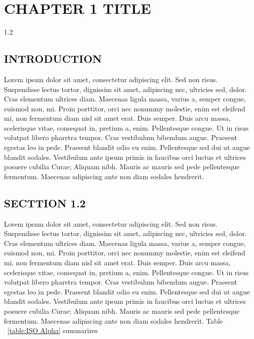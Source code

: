 \chapter{CHAPTER 1 TITLE }
\begin{spacing}{1.2}
\minitoc
\thispagestyle{MyStyle}
\end{spacing}
\newpage

\section{INTRODUCTION}
Lorem ipsum dolor sit amet, consectetur adipiscing elit. Sed non risus. Suspendisse lectus tortor, dignissim sit amet, adipiscing nec, ultricies sed, dolor. Cras elementum ultrices diam. Maecenas ligula massa, varius a, semper congue, euismod non, mi. Proin porttitor, orci nec nonummy molestie, enim est eleifend mi, non fermentum diam nisl sit amet erat. Duis semper. Duis arcu massa, scelerisque vitae, consequat in, pretium a, enim. Pellentesque congue. Ut in risus volutpat libero pharetra tempor. Cras vestibulum bibendum augue. Praesent egestas leo in pede. Praesent blandit odio eu enim. Pellentesque sed dui ut augue blandit sodales. Vestibulum ante ipsum primis in faucibus orci luctus et ultrices posuere cubilia Curae; Aliquam nibh. Mauris ac mauris sed pede pellentesque fermentum. Maecenas adipiscing ante non diam sodales hendrerit.
\section{SECTTION 1.2}
Lorem ipsum dolor sit amet, consectetur adipiscing elit. Sed non risus. Suspendisse lectus tortor, dignissim sit amet, adipiscing nec, ultricies sed, dolor. Cras elementum ultrices diam. Maecenas ligula massa, varius a, semper congue, euismod non, mi. Proin porttitor, orci nec nonummy molestie, enim est eleifend mi, non fermentum diam nisl sit amet erat. Duis semper. Duis arcu massa, scelerisque vitae, consequat in, pretium a, enim. Pellentesque congue. Ut in risus volutpat libero pharetra tempor. Cras vestibulum bibendum augue. Praesent egestas leo in pede. Praesent blandit odio eu enim. Pellentesque sed dui ut augue blandit sodales. Vestibulum ante ipsum primis in faucibus orci luctus et ultrices posuere cubilia Curae; Aliquam nibh. Mauris ac mauris sed pede pellentesque fermentum. Maecenas adipiscing ante non diam sodales hendrerit.
Table ~\ref{table:ISO Alpha} summarizes

